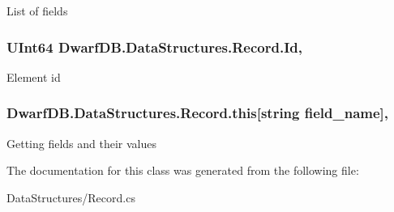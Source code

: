 List of fields 

\hypertarget{class_dwarf_d_b_1_1_data_structures_1_1_record_a6b33388f9fa7edcea1e29890da207be4}{
\subsubsection[{Id}]{\setlength{\rightskip}{0pt plus 5cm}U\+Int64 Dwarf\+D\+B.\+Data\+Structures.\+Record.\+Id\hspace{0.3cm}{\ttfamily [get]}, {\ttfamily [set]}}}\label{class_dwarf_d_b_1_1_data_structures_1_1_record_a6b33388f9fa7edcea1e29890da207be4}


Element id 

\hypertarget{class_dwarf_d_b_1_1_data_structures_1_1_record_a303a0895fdeb635fa47469b2ac46c4a3}{
\subsubsection[{this[string field\+\_\+name]}]{ Dwarf\+D\+B.\+Data\+Structures.\+Record.\+this\mbox{[}string field\+\_\+name\mbox{]}\hspace{0.3cm}{\ttfamily [get]}, {\ttfamily [set]}}}\label{class_dwarf_d_b_1_1_data_structures_1_1_record_a303a0895fdeb635fa47469b2ac46c4a3}


Getting fields and their values 



The documentation for this class was generated from the following file\+:\begin{DoxyCompactItemize}
\item 
Data\+Structures/Record.\+cs\end{DoxyCompactItemize}
